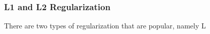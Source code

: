 \subsubsection{L1 and L2 Regularization}

There are two types of regularization that are popular, namely L
